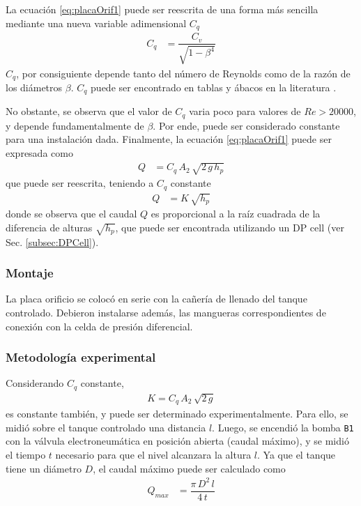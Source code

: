La ecuación \eqref{eq:placaOrif1} puede ser reescrita de una forma más sencilla
mediante una nueva variable adimensional $C_q$
\begin{align}
 C_q &= \dfrac{C_v}{\sqrt{1-\beta^4}}
\end{align}
$C_q$, por consiguiente depende tanto del número de Reynolds como de la razón
de los diámetros $\beta$. $C_q$ puede ser encontrado en tablas y ábacos en la
literatura \cite{bib:Mataix}.

No obstante, se observa que el valor de $C_q$ varia poco para valores de
$Re > 20000$, y depende fundamentalmente de $\beta$.
Por ende, puede ser considerado constante para una instalación dada.
Finalmente, la ecuación \eqref{eq:placaOrif1} puede ser expresada como
\begin{align}
 Q &= C_q\,A_2\, \sqrt{2\,g\,h_p}
\end{align}
que puede ser reescrita, teniendo a $C_q$ constante
\begin{align}
 Q &= K\,\sqrt{h_p}
 \label{eq:placaOrifPLC}
\end{align}
donde se observa que el caudal $Q$ es proporcional a la raíz cuadrada de
la diferencia de alturas $\sqrt{h_p}$, que puede
ser encontrada utilizando un DP cell (ver Sec. \ref{subsec:DPCell}).

\subsubsection{Montaje}
La placa orificio se colocó en serie con la cañería de llenado del
tanque controlado.
Debieron instalarse además, las mangueras correspondientes de conexión
con la celda de presión diferencial.

\subsubsection{Metodología experimental}
Considerando $C_q$ constante,
\begin{align}
 K = C_q\, A_2\, \sqrt{2\,g}
\end{align}
es constante también, y puede ser determinado experimentalmente.
Para ello, se midió sobre el tanque controlado una distancia $l$.
Luego, se encendió la bomba \verb|B1| con la válvula electroneumática en
posición
abierta (caudal máximo), y se midió el tiempo $t$ necesario para que el nivel
alcanzara la altura $l$.
Ya que el tanque tiene un diámetro $D$, el caudal máximo puede ser
calculado como
\begin{align}
 Q_{max} &= \dfrac{\pi\,D^2\,l}{4\,t}
\end{align}

